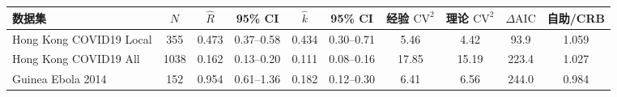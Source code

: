 \begin{tabular}{lcc c c c cc c c}
\toprule
数据集 & $N$ & $\hat R$ & 95\% CI & $\hat k$ & 95\% CI & 经验 $\text{CV}^2$ & 理论 $\text{CV}^2$ & $\Delta\text{AIC}$ & 自助/CRB \\
\midrule
Hong Kong COVID19 Local & 355 & 0.473 & 0.37--0.58 & 0.434 & 0.30--0.71 & 5.46 & 4.42 & 93.9 & 1.059 \\
Hong Kong COVID19 All & 1038 & 0.162 & 0.13--0.20 & 0.111 & 0.08--0.16 & 17.85 & 15.19 & 223.4 & 1.027 \\
Guinea Ebola 2014 & 152 & 0.954 & 0.61--1.36 & 0.182 & 0.12--0.30 & 6.41 & 6.56 & 244.0 & 0.984 \\
\bottomrule
\end{tabular}
